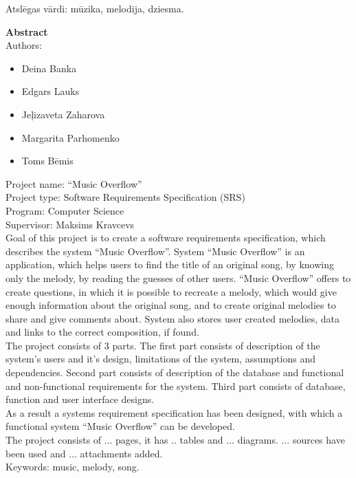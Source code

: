 \documentclass[12pt]{article}
\begin{document}
Atslēgas vārdi: mūzika, melodija, dziesma.

\pagebreak

\textbf{\large Abstract}\\
\indent Authors:
\begin{itemize}
	\setlength{\itemsep}{0em}
	\item Deina Banka
	\item Edgars Lauks
	\item Jeļizaveta Zaharova
	\item Margarita Parhomenko
	\item Toms Bēmis
\end{itemize}

\indent Project name: ``Music Overflow''\\
\indent Project type: Software Requirements Specification (SRS)\\
\indent Program: Computer Science\\
\indent Supervisor: Maksims Kravcevs\\

Goal of this project is to create a software requirements specification, which describes the system ``Music Overflow''. System ``Music Overflow'' is an application, which helps users to find the title of an original song, by knowing only the melody, by reading the guesses of other users. ``Music Overflow'' offers to create questions, in which it is possible to recreate a melody, which would give enough information about the original song, and to create original melodies to share and give comments about. System also stores user created melodies, data and links to the correct composition, if found.\\
\indent The project consists of 3 parts. The first part consists of description of the system's users and it's design, limitations of the system, assumptions and dependencies. Second part consists of description of the database and functional and non-functional requirements for the system. Third part consists of database, function and user interface designs.\\
\indent As a result a systems requirement specification has been designed, with which a functional system ``Music Overflow'' can be developed.\\
\indent The project consists of ... pages, it has .. tables and ... diagrams. ... sources have been used and ... attachments added.\\
\indent Keywords: music, melody, song.

\pagebreak
\end{document}
